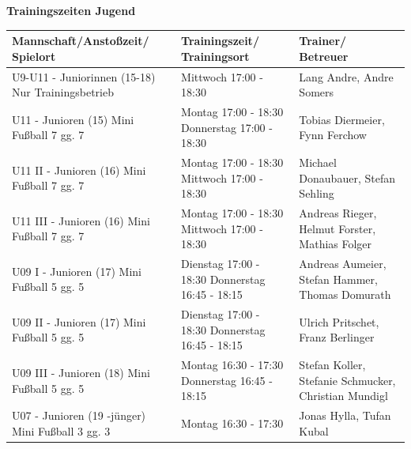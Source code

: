 
\begin{center}
    {
        \color{VereinsRot} \huge \textbf{Trainingszeiten Jugend}
    }
    
    \normalsize \RedStripes
\end{center}
\begin{table}[h!]
\centering
\renewcommand{\arraystretch}{1.5} %
\begin{tabular}{|p{6cm}|p{6cm}|p{6cm}|}
\hline
\textbf{Mannschaft/Anstoßzeit/ Spielort} & \textbf{Trainingszeit/ Trainingsort} & \textbf{Trainer/ Betreuer} \\ \hline
U9-U11 - Juniorinnen (15-18) \newline Nur Trainingsbetrieb & Mittwoch 17:00 - 18:30 & Lang Andre, Andre Somers \\ \hline
U11 - Junioren (15) \newline Mini Fußball 7 gg. 7 & Montag 17:00 - 18:30 \newline Donnerstag 17:00 - 18:30 & Tobias Diermeier, Fynn Ferchow \\ \hline
U11 II - Junioren (16) \newline Mini Fußball 7 gg. 7 & Montag 17:00 - 18:30 \newline Mittwoch 17:00 - 18:30 & Michael Donaubauer, Stefan Sehling \\ \hline
U11 III - Junioren (16) \newline Mini Fußball 7 gg. 7 & Montag 17:00 - 18:30 \newline Mittwoch 17:00 - 18:30 & Andreas Rieger, Helmut Forster, Mathias Folger \\ \hline
U09 I - Junioren (17) \newline Mini Fußball 5 gg. 5 & Dienstag 17:00 - 18:30 \newline Donnerstag 16:45 - 18:15 & Andreas Aumeier, Stefan Hammer, Thomas Domurath \\ \hline
U09 II - Junioren (17) \newline Mini Fußball 5 gg. 5 & Dienstag 17:00 - 18:30 \newline Donnerstag 16:45 - 18:15 & Ulrich Pritschet, Franz Berlinger \\ \hline
U09 III - Junioren (18) \newline Mini Fußball 5 gg. 5 & Montag 16:30 - 17:30 \newline Donnerstag 16:45 - 18:15 & Stefan Koller, Stefanie Schmucker, Christian Mundigl \\ \hline
U07 - Junioren (19 -jünger) \newline Mini Fußball 3 gg. 3 & Montag 16:30 - 17:30 & Jonas Hylla, Tufan Kubal \\ \hline
\end{tabular}
\end{table}